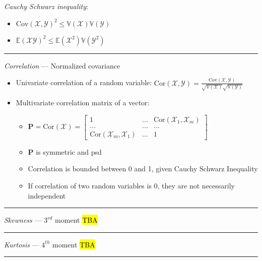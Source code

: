 \emph{Cauchy Schwarz inequality}: \begin{itemize}
    \item $\textrm{Cov}(\mathcal{X},\mathcal{Y})^2 \leq \mathbb{V}(\mathcal{X})\mathbb{V}(\mathcal{Y})$
    \item $\mathbb{E}(\mathcal{X}\mathcal{Y})^2 \leq \mathbb{E}(\mathcal{X}^2)\mathbb{V}(\mathcal{Y}^2)$
\end{itemize}

{\color{lightgray}\hrule height 0.001mm}

\emph{Correlation} --- Normalized covariance
\begin{itemize}
    \item Univariate correlation of a random variable: $\textrm{Cor}(\mathcal{X}, \mathcal{Y}) = \frac{\textrm{Cov}(\mathcal{X}, \mathcal{Y})}{\sqrt{\mathbb{V}(\mathcal{X})} \sqrt{\mathbb{V}(\mathcal{Y})}}$ 
    \item Multivariate correlation matrix of a vector: 
    \begin{itemize}
        \item $\boldsymbol{P} = \textrm{Cor}(\boldsymbol{\mathcal{X}}) = \begin{bmatrix}
        1 & ... & \textrm{Cor}(\mathcal{X}_1,\mathcal{X}_m) \\
        ... & ... & ... \\
        \textrm{Cor}(\mathcal{X}_m,\mathcal{X}_1) & ... & 1
        \end{bmatrix}$
        \item $\boldsymbol{P}$ is symmetric and psd
        \item Correlation is bounded between 0 and 1, given Cauchy Schwarz Inequality
        \item If correlation of two random variables is 0, they are not necessarily independent
    \end{itemize}
\end{itemize}

{\color{lightgray}\hrule height 0.001mm}

\emph{Skewness} --- $3^{rd}$ moment \hl{TBA}

{\color{lightgray}\hrule height 0.001mm}

\emph{Kurtosis} --- $4^{th}$ moment \hl{TBA}

{\color{black}\hrule height 0.001mm}

